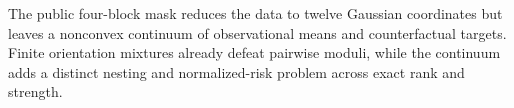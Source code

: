 The public four-block mask reduces the data to twelve Gaussian coordinates but leaves a nonconvex continuum of observational means and counterfactual targets.  Finite orientation mixtures already defeat pairwise moduli, while the continuum adds a distinct nesting and normalized-risk problem across exact rank and strength.